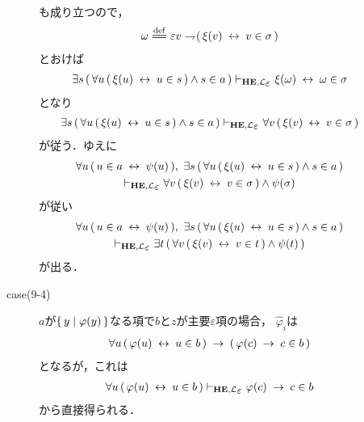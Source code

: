 \begin{metaprf}
\begin{description}
\begin{description}
\begin{align}
						\end{align}
						も成り立つので，
						\begin{align}
							\omega \defeq \varepsilon v \negation (\, \xi(v) \lrarrow v \in \sigma\, )
						\end{align}
						とおけば
						\begin{align}
							\exists s\, (\, \forall u\, (\, \xi(u) \lrarrow u \in s\, ) \wedge s \in a\, ) 
							\provable{\mbox{{\bf HE}},\lang{\varepsilon}} \xi(\omega) \lrarrow \omega \in \sigma
						\end{align}
						となり
						\begin{align}
							\exists s\, (\, \forall u\, (\, \xi(u) \lrarrow u \in s\, ) \wedge s \in a\, ) 
							\provable{\mbox{{\bf HE}},\lang{\varepsilon}} \forall v\, (\, \xi(v) \lrarrow v \in \sigma\, )
						\end{align}
						が従う．ゆえに
						\begin{align}
							\begin{gathered}
								\forall u\, (\, u \in a \lrarrow \psi(u)\, ),\ 
								\exists s\, (\, \forall u\, (\, \xi(u) \lrarrow u \in s\, ) \wedge s \in a\, ) \\
								\provable{\mbox{{\bf HE}},\lang{\varepsilon}} \forall v\, (\, \xi(v) \lrarrow v \in \sigma\, ) \wedge \psi(\sigma)
							\end{gathered}
						\end{align}
						が従い
						\begin{align}
							\begin{gathered}
								\forall u\, (\, u \in a \lrarrow \psi(u)\, ),\ 
								\exists s\, (\, \forall u\, (\, \xi(u) \lrarrow u \in s\, ) \wedge s \in a\, ) \\
								\provable{\mbox{{\bf HE}},\lang{\varepsilon}} \exists t\, (\, \forall v\, (\, \xi(v) \lrarrow v \in t\, ) \wedge \psi(t)\, )
							\end{gathered}
						\end{align}
						が出る．
						
					\item[case(9-4)] $a$が$\{\, y \mid \varphi(y)\, \}$なる項で$b$と$z$が主要$\varepsilon$項の場合，
						$\widehat{\varphi}_{i}$は
						\begin{align}
							\forall u\, (\, \varphi(u) \hspace{0.25em}\leftrightarrow\hspace{0.25em} u \in b\, ) 
							\hspace{0.25em}\rightarrow\hspace{0.25em} (\, \varphi(c) \hspace{0.25em}\rightarrow\hspace{0.25em} c \in b\, )
						\end{align}
						となるが，これは
						\begin{align}
							\forall u\, (\, \varphi(u) \lrarrow u \in b\, ) 
							\provable{\mbox{{\bf HE}},\lang{\varepsilon}} 
							\varphi(c) \rarrow c \in b
						\end{align}
						から直接得られる．
						

\end{description}
\end{description}
\end{metaprf}
